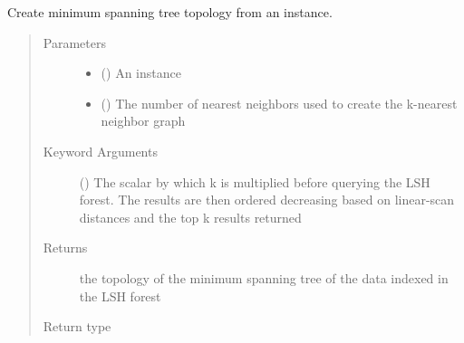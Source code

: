 \documentclass[letterpaper,10pt,english]{sphinxmanual}
\begin{document}

\begin{fulllineitems}
\label{\detokenize{documentation:tmap.mst_from_lsh_forest}}
Create minimum spanning tree topology from an {\hyperref[\detokenize{documentation:tmap.LSHForest}]{}} instance.
\begin{quote}\begin{description}
\item[{Parameters}] \leavevmode\begin{itemize}
\item {} 
 ({\hyperref[\detokenize{documentation:tmap.LSHForest}]{}}) \textendash{} An {\hyperref[\detokenize{documentation:tmap.LSHForest}]{}} instance

\item {} 
 () \textendash{} The number of nearest neighbors used to create the k-nearest neighbor graph

\end{itemize}

\item[{Keyword Arguments}] \leavevmode
{} () \textendash{} The scalar by which k is multiplied before querying the LSH forest. The results are then ordered decreasing based on linear-scan distances and the top k results returned

\item[{Returns}] \leavevmode
the topology of the minimum spanning tree of the data indexed in the LSH forest

\item[{Return type}] \leavevmode
{}

\end{description}\end{quote}

\end{fulllineitems}
\end{document}
